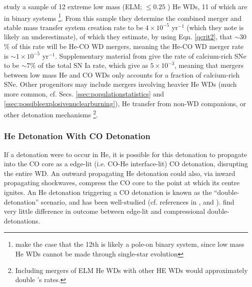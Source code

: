\cite{brow+11} study a sample of 12 extreme low mass (ELM; $\leq 0.25$ {\Msun}) He WDs, 11 of which are in binary systems \footnote{\citeauthor{brow+11} make the case that the 12th is likely a pole-on binary system, since low mass He WDs cannot be made through single-star evolution}.  From this sample they determine the combined merger and stable mass transfer system creation rate to be $4 \times 10^{-5}$ yr$^{-1}$ (which they note is likely an underestimate), of which they estimate, by using Eqn. \ref{qcrit2}, that $\sim 30$\% of this rate will be He-CO WD mergers, meaning the He-CO WD merger rate is $\sim 1 \times 10^{-5}$ yr$^{-1}$.  Supplementary material from \citeauthor{pere+10a} give the rate of calcium-rich SNe to be $\sim 7$\% of the total SN Ia rate, which \citeauthor{brow+11} give as $5 \times 10^{-3}$, meaning that mergers between low mass He and CO WDs only accounts for a fraction of calcium-rich SNe.  Other progenitors may include mergers involving heavier He WDs (much more common, cf. Secs. \ref{ssec:populationstatistics} and \ref{ssec:possibleexplosivenuclearburning}), He transfer from non-WD companions, or other detonation mechanisms \footnote{Including mergers of ELM He WDs with other HE WDs would approximately double \citeauthor{brow+11}'s rates.}.






\subsubsection{He Detonation With CO Detonation}

If a detonation were to occur in He, it is possible for this detonation to propagate into the CO core as a edge-lit (i.e. CO-He interface-lit) CO detonation, disrupting the entire WD.  An outward propagating He detonation could also, via inward propagating shockwaves, compress the CO core to the point at which its centre ignites.  An He detonation triggering a CO detonation is known as the ``double-detonation'' scenario, and has been well-studied (cf. references in \cite{woosk10}, \cite{finkhr07} and \cite{fink+10}).  \citeauthor{woosk10} find very little difference in outcome between edge-lit and compressional double-detonations.

